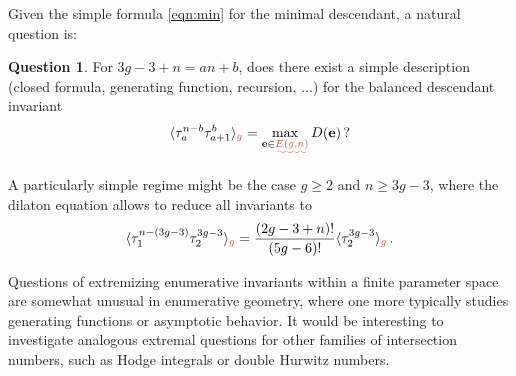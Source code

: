 \documentclass[12pt,reqno]{amsart}
\theoremstyle{definition}
\newtheorem{question}[theorem]{Question}
\newcommand{\aiinline}[1]{{\color{aicolor}\uwave{#1}}}
\begin{document}
\begin{humanparagraph}
Given the simple formula \eqref{eqn:min} for the minimal descendant, a natural question is:
\begin{question}
For  $3g-3+n = an + b$, does there exist a simple description (closed formula, generating function, recursion, $\ldots$) for the balanced descendant invariant
\begin{equation} \label{eqn:balanced}
    \langle \tau_{a} ^{n-b} \tau_{a+1}^b \rangle_{\aiinline{g}} = \max_{\textbf{e} \in \aiinline{E(g,n)}} D(\textbf{e})\,?
\end{equation}
\end{question}
A particularly simple regime might be the case $g \geq 2$ and $n \geq 3g-3$, where the dilaton equation allows to reduce all invariants to
\begin{equation} \label{eqn:dilaton}
    \langle \tau_1^{n-(3g-3)} \tau_2^{3g-3} \rangle_{\aiinline{g}} = \frac{(2g-3+n)!}{(5g-6)!} \langle \tau_2^{3g-3} \rangle_{\aiinline{g}}\,.
\end{equation}
\end{humanparagraph}
\begin{aiparagraph}
  
Questions of extremizing enumerative invariants within a finite parameter space are somewhat unusual in enumerative geometry, where one more typically studies generating functions or asymptotic behavior. It would be interesting to investigate analogous extremal questions for other families of intersection numbers, such as Hodge integrals or double Hurwitz numbers.
\end{aiparagraph}
\end{document}
